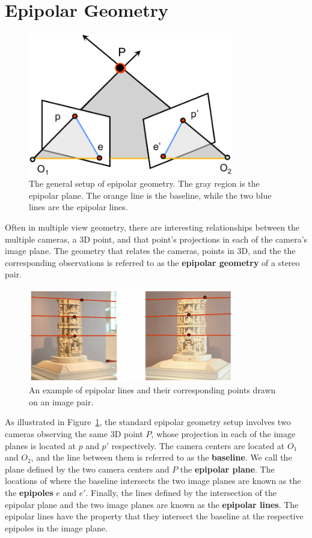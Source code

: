 \documentclass[a4paper, 12pt]{article}
\renewcommand\emph{\textbf}
\begin{document}
\section{Epipolar Geometry}
\begin{figure}[h!]
\centering
\includegraphics[width=0.8\textwidth]{figures/epipolar.png}
\caption{The general setup of epipolar geometry. The gray region is the epipolar plane. The orange line is the baseline, while the two blue lines are the epipolar lines.}
\label{fig:epipolar}
\end{figure}
Often in multiple view geometry, there are interesting relationships between the multiple cameras, a 3D point, and that point's projections in each of the camera's image plane. The geometry that relates the cameras, points in 3D, and the the corresponding observations is referred to as the \emph{epipolar geometry} of a stereo pair. 

\begin{figure}[h!]
\centering
\includegraphics[width=0.8\textwidth]{figures/epipolar_example.png}
\caption{An example of epipolar lines and their corresponding points drawn on an image pair.}
\label{fig:epipolar_example}
\end{figure}
As illustrated in Figure~\ref{fig:epipolar}, the standard epipolar geometry setup involves two cameras observing the same 3D point $P$, whose projection in each of the image planes is located at $p$ and $p'$ respectively. The camera centers are located at $O_1$ and $O_2$, and the line between them is referred to as the \emph{baseline}. We call the plane defined by the two camera centers and $P$ the \emph{epipolar plane}. The locations of where the baseline intersects the two image planes are known as the the \emph{epipoles} $e$ and $e'$. Finally, the lines defined by the intersection of the epipolar plane and the two image planes are known as the \emph{epipolar lines}. The epipolar lines have the property that they intersect the baseline at the respective epipoles in the image  plane.
\end{document}
